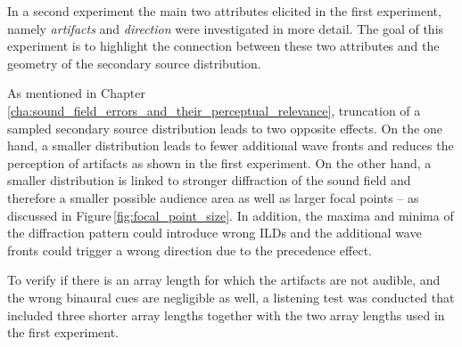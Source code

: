 In a second experiment the main two attributes elicited in the first experiment,
namely \emph{artifacts} and \emph{direction} were investigated in more detail.
The goal of this experiment is to highlight the connection between these two
attributes and the geometry of the secondary source distribution.

As mentioned in
Chapter\,\ref{cha:sound_field_errors_and_their_perceptual_relevance}, truncation
of a sampled secondary source distribution leads to two opposite
effects. On the one hand, a smaller distribution leads to fewer additional
wave fronts and reduces the perception of artifacts as shown in the first
experiment. On the other hand, a smaller distribution is linked to stronger
diffraction of the sound field and therefore a smaller possible audience area
as well as larger focal points -- as discussed in
Figure\,\ref{fig:focal_point_size}.
In addition, the maxima and minima of the diffraction pattern could introduce
wrong \acp{ILD} and the additional wave fronts could trigger a wrong direction
due to the precedence effect.

To verify if there is an array length for which the artifacts are not audible,
and the wrong binaural cues are negligible as well, a listening test was
conducted that included three shorter array lengths together with the two
array lengths used in the first experiment.



